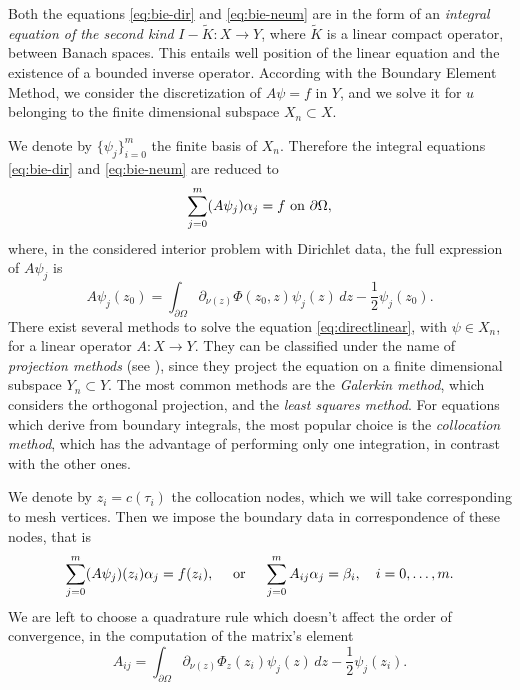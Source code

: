 \documentclass[10pt, a4paper]{article} %
\numberwithin{equation}{section}
\theoremstyle{definition}
\theoremstyle{plain}
\theoremstyle{plain}
\theoremstyle{plain}
\theoremstyle{plain}
\theoremstyle{plain}
\theoremstyle{plain}
\theoremstyle{plain}
\theoremstyle{plain}
\newcommand{\upon}{\textup{ on }}
\begin{document}
Both the equations \eqref{eq:bie-dir} and \eqref{eq:bie-neum} are in the form of an \emph{integral equation 
of the second kind} $I - \tilde{K}:X\to Y$, where $\tilde{K}$ is a linear compact operator, between Banach spaces.
This entails well position of the linear equation and the existence of a bounded inverse operator.
According with the Boundary Element Method, we consider the discretization
of $A\psi=f$ in $Y$, and we solve it for $u$ belonging to the finite dimensional 
subspace $X_n\subset X$.
\par
We denote by $\{\psi_j\}_{i=0}^m$ the finite basis of $X_n$.
Therefore the integral equations \eqref{eq:bie-dir} and \eqref{eq:bie-neum} are reduced to
\begin{equation}
 \sum_{j=0}^m(A\psi_j) \alpha_j = f \upon \partial\Omega,\label{eq:directlinear}
\end{equation}
where, in the considered interior problem with Dirichlet data, the full expression of $A\psi_j$ is
\begin{equation}
 A\psi_j(z_0) = \int_{\partial\Omega}\partial_{\nu(z)}\Phi(z_0, z)\psi_j(z)\,dz  - \frac{1}{2}\psi_j(z_0).
\end{equation}
There exist several methods to solve the equation \eqref{eq:directlinear}, with $\psi\in X_n$, 
for a linear operator $A:X\to Y$. They 
can be classified under the name of \emph{projection methods} (see \cite{kirsch:book}), since
they project the equation on a finite dimensional subspace $Y_n\subset Y$.
The most common methods are the \emph{Galerkin method}, which considers the orthogonal projection,
and the \emph{least squares method}. For equations which derive from boundary integrals, 
the most popular choice is the \emph{collocation method}, which has the advantage of 
performing only one integration, in contrast with the other ones.
\par
We denote by $z_i = c(\tau_i)$ the collocation nodes, which we will take corresponding to 
mesh vertices. Then we impose the boundary data in correspondence of these nodes, that is
\begin{equation}
 \sum_{j=0}^m(A\psi_j)(z_i) \alpha_j = f(z_i), \quad \textup{ or }\quad \sum_{j=0}^mA_{ij}\alpha_j = \beta_i, 
 \quad i=0,\dots,m.\label{eq:bie-collocated}
\end{equation}
We are left to choose a quadrature rule which doesn't affect the order of convergence, 
in the computation of the matrix's element
\begin{equation}
\label{eq:Aij}
 A_{ij} = \int_{\partial\Omega}\partial_{\nu(z)}\Phi_{z}(z_i) \psi_j(z)\,dz - \frac{1}{2} \psi_j(z_i).
\end{equation}
\end{document}
